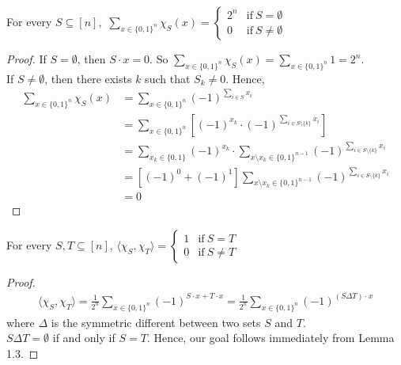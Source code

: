 \begin{lemma}
For every $S \subseteq [n],$ \center
$\sum\limits_{x \in \{ 0, 1 \}^n} \chi_S(x) =
\begin{cases}
2^n      & \text{if} \ S = \emptyset \\
0        & \text{if} \ S \neq \emptyset
\end{cases}$
\end{lemma}

\begin{proof}
If $ S = \emptyset $, then $S \cdot x = 0$. So $\sum\limits_{x \in \{ 0, 1 \}^n} \chi_S(x) = \sum \limits_{x \in \{ 0, 1 \}^n} 1 = 2^n $.\\
If $S \neq \emptyset$, then there exists $k$ such that $S_k \neq 0$. Hence, \\
\begin{align*}
\sum\limits_{x \in \{ 0, 1 \}^n} \chi_S(x) 
& = \sum\limits_{x \in \{ 0, 1 \}^n} (-1)^{\sum \limits_{i \in S} x_i} \\
& = \sum\limits_{x \in \{ 0, 1 \}^n} [(-1)^{x_k} \cdot (-1)^{\sum\limits_{i \in S \setminus \{k \}} x_i}] \\
& = \sum\limits_{x_k \in \{0, 1 \} }(-1)^{x_k} 
\cdot \sum\limits_{x \setminus x_k \in \{0,1\}^{n-1}} (-1)^{\sum\limits_{i \in S \setminus \{k \}} x_i}  \\
& = \left[(-1)^0 + (-1)^1 \right] \sum\limits_{x \setminus x_k \in \{0,1\}^{n-1}} (-1)^{\sum\limits_{i \in S \setminus \{k \}} x_i} \\
& = 0
\end{align*}
\end{proof}

\begin{theorem}
For every $S, T \subseteq [n]$,
\center
$\langle \chi_S, \chi_T \rangle =
\begin{cases}
1      & \text{if} \ S = T \\
0      & \text{if} \ S \neq T
\end{cases}$
\end{theorem}

\begin{proof}
\begin{align*}
\langle \chi_S, \chi_T \rangle 
= \frac{1}{2^n}  \sum\limits_{x \in \{0,1\}^n} (-1)^{S \cdot x + T \cdot x}
= \frac{1}{2^n}  \sum\limits_{x \in \{0,1\}^n} (-1)^{(S \Delta T) \cdot x}
\end{align*}
where $\Delta$ is the symmetric different between two sets $S$ and $T$. \\
 $S \Delta T = \emptyset$ if and only if  $S = T$. Hence, our goal follows immediately from Lemma 1.3.
\end{proof}

